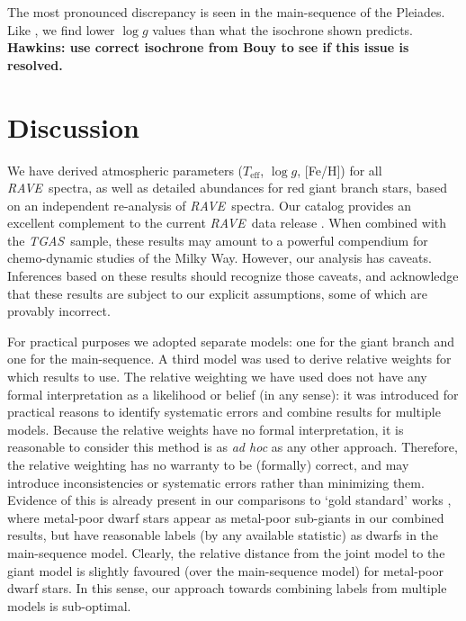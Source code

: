 \documentclass[preprint,trackchanges]{aastex}
\newcommand{\acronym}[1]{{\small{#1}}}
\newcommand{\project}[1]{\textsl{#1}}
\newcommand{\rave}{\project{\acronym{RAVE}}}
\newcommand{\tgas}{\project{\acronym{TGAS}}}
\newcommand{\stub}[1]{{\color{blue} \textbf{#1}}}
\newcommand{\teff}{T_{\mathrm{eff}}}
\newcommand{\logg}{\log g}
\begin{document}
The most pronounced discrepancy is seen in the main-sequence of the Pleiades.
Like \citet{Kordopatis_2013}, we find lower $\logg$ values than what the isochrone
shown predicts.  \stub{Hawkins: use correct isochrone from Bouy to see if this issue is resolved.}


\section{Discussion}
\label{sec:discussion}


We have derived atmospheric parameters ($\teff$, $\logg$, [Fe/H]) for all \rave\ 
spectra, as well as detailed abundances for red giant branch stars, based on an
independent re-analysis of \rave\ spectra.  Our catalog provides an excellent
complement to the current \rave\ data release \citep{Kunder_2016}.  
When combined with the \tgas\ sample, these results may amount to a powerful
compendium for chemo-dynamic studies of the Milky Way.  However, our analysis has caveats.
Inferences based on these results should recognize those caveats, and acknowledge that 
these results are subject to our explicit assumptions, some of which are provably
incorrect.


For practical purposes we adopted separate models: one for the giant branch and one
for the main-sequence.  A third model was used to derive relative weights for which
results to use.  The relative weighting we have used does not have any formal
interpretation as a likelihood or belief (in any sense): it was introduced for
practical reasons to identify systematic errors and combine results for multiple
models.  Because the relative weights have no formal interpretation, it is reasonable
to consider this method is as \emph{ad hoc} as any other approach.  Therefore, the
relative weighting has no warranty to be (formally) correct, and may introduce 
inconsistencies or systematic errors rather than
minimizing them.  Evidence of this is already present in our comparisons to
`gold standard' works \citep{Bensby_2014,Reddy_2003,Reddy_2006,Valenti_Fischer_2005},
where metal-poor dwarf stars appear as metal-poor sub-giants in our combined results,
but have reasonable labels (by any available statistic) as dwarfs in the main-sequence
model.  Clearly, the relative distance from the joint model to the giant model is 
slightly favoured (over the main-sequence model) for metal-poor dwarf stars. In this
sense, our approach towards combining labels from multiple models is sub-optimal.
\end{document}
